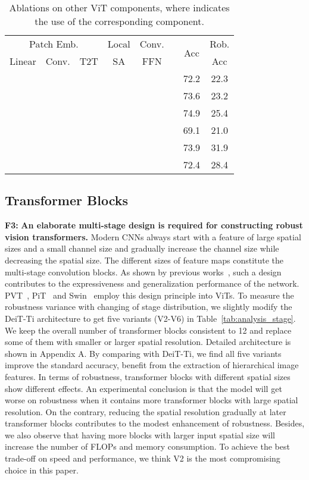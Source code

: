 \documentclass[10pt,twocolumn,letterpaper]{article}
\makeatletter
\newcommand{\tablestyle}[2]{\setlength{\tabcolsep}{#1}\renewcommand{\arraystretch}{#2}\centering\footnotesize}
\newcommand{\cmark}{\ding{51}}\newcommand{\tabincell}[2]{\begin{tabular}{@{}#1@{}}#2\end{tabular}}
\makeatother
\begin{document}
\begin{table}[h!]
    \small
  \centering
        \tablestyle{5pt}{1.05}
        \caption{Ablations on other ViT components, where \cmark indicates the use of the corresponding component. }
        \vspace{-0.7mm}
  \begin{tabular}{c|c|c|c|c|c|c|c}
  \toprule
  \multicolumn{3}{c|}{Patch Emb.} 
  & Local & Conv. & \multirow{2}{*}{} & \multirow{2}{*}{Acc} & Rob. \\
  Linear & Conv. & T2T & SA & FFN & & & Acc \\
  \midrule
  \cmark & &  &  & & \cmark & 72.2 & 22.3 \\
  & \cmark & &  & & \cmark & 73.6 & 23.2\\
  &  & \cmark &  & & \cmark & 74.9 & 25.4\\
  \cmark &  & & \cmark  &  & \cmark & 69.1 & 21.0\\
  \cmark &  & & & \cmark &  & 73.9 & 31.9\\
  \cmark &  & &  &  & \cmark & 72.4 & 28.4 \\
  \bottomrule
  \end{tabular}
  \label{tab:analysis_other}
\end{table}

\subsection{Transformer Blocks} 
\textbf{F3: }\textbf{An elaborate multi-stage design is required for constructing robust vision transformers.} Modern CNNs always start with a feature of large spatial sizes and a small channel size and gradually increase the channel size while decreasing the spatial size. The different sizes of feature maps constitute the multi-stage convolution blocks. As shown by previous works~\cite{cohen2016inductive}, such a design contributes to the expressiveness and generalization performance of the network. PVT~\cite{wang2021pyramid}, PiT~\cite{heo2021rethinking} and Swin~\cite{liu2021swin} employ this design principle into ViTs. To measure the robustness variance with changing of stage distribution, we slightly modify the DeiT-Ti architecture to get five variants (V2-V6) in Table~\ref{tab:analysis_stage}. We keep the overall number of transformer blocks consistent to 12 and replace some of them with smaller or larger spatial resolution. Detailed architecture is shown in Appendix A. By comparing with DeiT-Ti, we find all five variants improve the standard accuracy, benefit from the extraction of hierarchical image features. In terms of robustness, transformer blocks with different spatial sizes show different effects. An experimental conclusion is that the model will get worse on robustness when it contains more transformer blocks with large spatial resolution. On the contrary, reducing the spatial resolution gradually at later transformer blocks contributes to the modest enhancement of robustness. Besides, we also observe that having more blocks with larger input spatial size will increase the number of FLOPs and memory consumption. To achieve the best trade-off on speed and performance, we think V2 is the most compromising choice in this paper. 
\end{document}
